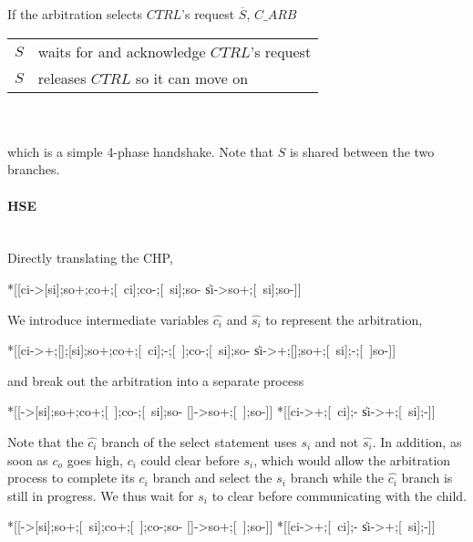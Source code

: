 \documentclass[aer.tex]{subfiles}
\begin{document}
\noindent If the arbitration selects $CTRL$'s request $\overline{S}$, $C\!\_ARB$

\begin{tabular}[]{rl}
  $S$ & waits for and acknowledge $CTRL$'s request \\
  $S$ & releases $CTRL$ so it can move on \\
\end{tabular} \\ \\

\noindent which is a simple 4-phase handshake. Note that $S$ is shared between the two branches.

\paragraph{HSE}\mbox{}\\

\noindent Directly translating the CHP,

\begin{hse}
*[[ci->[si];so+;co+;[~ci];co-;[~si];so-
  \|si->so+;[~si];so-]]
\end{hse}

\noindent We introduce intermediate variables $\hat{c_i}$ and $\hat{s_i}$ to represent the arbitration,

\begin{hse}
*[[ci->+;[];[si];so+;co+;[~ci];-;[~];co-;[~si];so-
  \|si->+;[];so+;[~si];-;[~]so-]]
\end{hse}

\noindent and break out the arbitration into a separate process

\begin{hse}
*[[->[si];so+;co+;[~];co-;[~si];so-
  []->so+;[~];so-]]
*[[ci->+;[~ci];-
  \|si->+;[~si];-]]
\end{hse}

\noindent Note that the $\hat{c_i}$ branch of the select statement uses $s_i$ and not $\hat{s_i}$. In addition, as soon as $c_o$ goes high, $c_i$ could clear before $s_i$, which would allow the arbitration process to complete its $c_i$ branch and select the $s_i$ branch while the $\hat{c_i}$ branch is still in progress. We thus wait for $s_i$ to clear before communicating with the child.

\begin{hse}
*[[->[si];so+;[~si];co+;[~];co-;so-
  []->so+;[~];so-]]
*[[ci->+;[~ci];-
  \|si->+;[~si];-]]
\end{hse}
\end{document}
